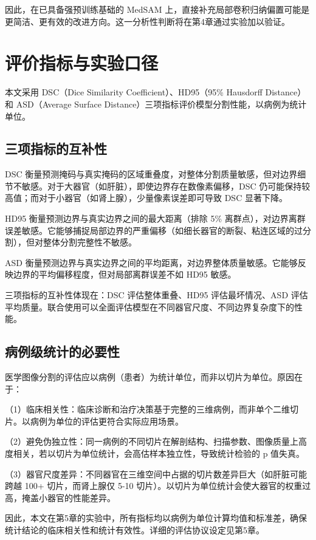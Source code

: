 因此，在已具备强预训练基础的 MedSAM 上，直接补充局部卷积归纳偏置可能是更简洁、更有效的改进方向。这一分析性判断将在第4章通过实验加以验证。

\section{评价指标与实验口径}

本文采用 DSC（Dice Similarity Coefficient）、HD95（95\% Hausdorff Distance）和 ASD（Average Surface Distance）三项指标\cite{taha2015metrics}评价模型分割性能，以病例为统计单位。

\subsection{三项指标的互补性}

DSC 衡量预测掩码与真实掩码的区域重叠度，对整体分割质量敏感，但对边界细节不敏感。对于大器官（如肝脏），即使边界存在数像素偏移，DSC 仍可能保持较高值；而对于小器官（如肾上腺），少量像素误差即可导致 DSC 显著下降。

HD95 衡量预测边界与真实边界之间的最大距离（排除 5\% 离群点），对边界离群误差敏感。它能够捕捉局部边界的严重偏移（如细长器官的断裂、粘连区域的过分割），但对整体分割完整性不敏感。

ASD 衡量预测边界与真实边界之间的平均距离，对边界整体质量敏感。它能够反映边界的平均偏移程度，但对局部离群误差不如 HD95 敏感。

三项指标的互补性体现在：DSC 评估整体重叠、HD95 评估最坏情况、ASD 评估平均质量。联合使用可以全面评估模型在不同器官尺度、不同边界复杂度下的性能。

\subsection{病例级统计的必要性}

医学图像分割的评估应以病例（患者）为统计单位，而非以切片为单位。原因在于：

（1）临床相关性：临床诊断和治疗决策基于完整的三维病例，而非单个二维切片。以病例为单位的评估更符合实际应用场景。

（2）避免伪独立性：同一病例的不同切片在解剖结构、扫描参数、图像质量上高度相关，若以切片为单位统计，会高估样本独立性，导致统计检验的 p 值失真。

（3）器官尺度差异：不同器官在三维空间中占据的切片数差异巨大（如肝脏可能跨越 100+ 切片，而肾上腺仅 5-10 切片）。以切片为单位统计会使大器官的权重过高，掩盖小器官的性能差异。

因此，本文在第5章的实验中，所有指标均以病例为单位计算均值和标准差，确保统计结论的临床相关性和统计有效性。详细的评估协议设定见第5章。

